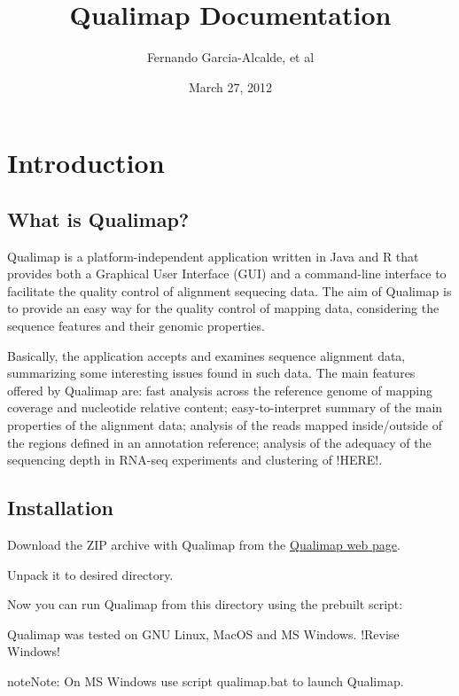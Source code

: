 \documentclass[a4paper,10pt,english]{sphinxmanual}
\title{Qualimap Documentation}
\date{March 27, 2012}
\author{Fernando Garcia-Alcalde, et al}
\begin{document}
\maketitle
\tableofcontents
{}\label{index::doc}



\chapter{Introduction}
\label{intro:introduction}\label{intro:intro}\label{intro::doc}

\section{What is Qualimap?}
\label{intro:what-is-qualimap}
Qualimap is a platform-independent application written in Java and R that provides both a Graphical User Interface (GUI) and a command-line interface to facilitate the quality control of alignment sequecing data. The aim of Qualimap is to provide an easy way for the quality control of mapping data, considering the sequence features and their genomic properties.

Basically, the application accepts and examines sequence alignment data, summarizing some interesting issues found in such data. The main features offered by Qualimap are: fast analysis across the reference genome of mapping coverage and nucleotide relative content; easy-to-interpret summary of the main properties of the alignment data; analysis of the reads mapped inside/outside of the regions defined in an annotation reference; analysis of the adequacy of the sequencing depth in RNA-seq experiments and clustering of !HERE!.


\section{Installation}
\label{intro:installation}
Download the ZIP archive with Qualimap from the \href{http://qualimap.org}{Qualimap web page}.

Unpack it to desired directory.

Now you can run Qualimap from this directory using the prebuilt script:


Qualimap was tested on GNU Linux, MacOS and MS Windows. !Revise Windows!

\begin{notice}{note}{Note:}
On MS Windows use script qualimap.bat to launch Qualimap.
\end{notice}
\end{document}
